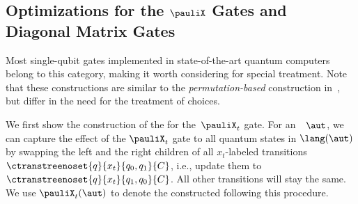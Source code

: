 \newcommand{\algPGateSimple}[0]{
\begin{algorithm}[b]
\caption{Application of a~diagonal matrix gate on an \lsta}
\label{algo:p_gate_single}
\KwIn{An \lsta $\aut=\tuple{Q, \Sigma, \Delta, \rootstates}$, a diagonal matrix gate $\gateof{D}^{r_0,r_1}_t$}
\KwOut{$\gateof{D}^{r_0,r_1}_t(\aut)$}
Build $\aut'=\tuple{Q',\Sigma,\Delta',\rootstates'}$, a primed copy of $\aut$\;
Replace internal $x_t$-transitions $\ctranstreenoset {q} {x_t}{q_0,q_1}{C}$ from $\Delta$ with $\ctranstreenoset {q} {x_t}{q_0,q'_1}{C}$\;
Replace leaf transitions $\ctranstreenoset
    {q}{k}{}{C}$ from $\Delta$ with $\ctranstreenoset {q} {r_0\cdot k}{}{C}$;
    Add $r_0 \cdot k$ to~$\Sigma$\;
Replace leaf transitions $\ctranstreenoset
    {q'}{k}{}{C}$ from $\Delta'$ with $\ctranstreenoset {q'} {r_1\cdot k}{}{C}$;
    Add $r_1 \cdot k$ to~$\Sigma$\;
   
    
\Return {$\tuple{Q\cup Q', \Sigma,
	\Delta\cup\Delta', \rootstates}$}\;
\end{algorithm}
}

\vspace{-3.0mm}
\subsection{Optimizations for the $\pauliX$ Gates and Diagonal Matrix Gates}
\vspace{-1.0mm}

Most single-qubit gates implemented in state-of-the-art quantum computers belong to this category, making it worth considering for special treatment. Note that these constructions are similar to the \emph{permutation-based} construction in~\cite{ChenCLLTY23}, but differ in the need for the treatment of choices.

We first show the construction of the \lsta for the~$\pauliX_t$ gate.  
For an~\lsta~$\aut$, we can capture the effect of the $\pauliX_t$ gate to all
quantum states in $\lang(\aut)$ by swapping the left and the right children of
all $x_t$-labeled transitions $\ctranstreenoset {q} {x_t} {q_0, q_1}{C}$, i.e.,
update them to $\ctranstreenoset {q} {x_t} {q_1, q_0}{C}$. All other transitions will stay the same.
We use  $\pauliX_t(\aut)$ to denote the \lsta constructed following this procedure. 

